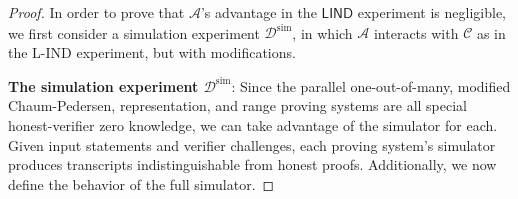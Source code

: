 \documentclass{llncs}
\newcommand{\func}[1]{\mathsf{#1}}
\begin{document}
\begin{proof}
In order to prove that $\mathcal{A}$'s advantage in the $\func{LIND}$ experiment is negligible, we first consider a simulation experiment $\mathcal{D}^{\text{sim}}$, in which $\mathcal{A}$ interacts with $\mathcal{C}$ as in the L-IND experiment, but with modifications.

\textbf{The simulation experiment $\mathcal{D}^{\text{sim}}$}: Since the parallel one-out-of-many, modified Chaum-Pedersen, representation, and range proving systems are all special honest-verifier zero knowledge, we can take advantage of the simulator for each.
Given input statements and verifier challenges, each proving system's simulator produces transcripts indistinguishable from honest proofs.
Additionally, we now define the behavior of the full simulator.


\end{proof}
\end{document}
